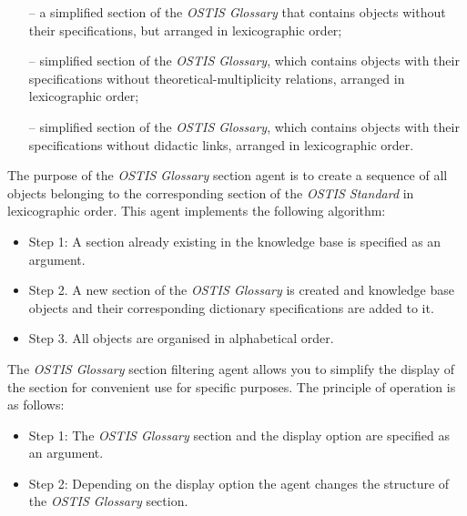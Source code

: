 \documentclass[10pt,a4paper]{article}
\begin{document}
\begin{multicols}{2}
\begin{itemize}

\item[--] a simplified section of the \textit{OSTIS Glossary} that contains objects without their specifications, but arranged in lexicographic order;
\item[--] simplified section of the \textit{OSTIS Glossary}, which contains objects with their specifications without theoretical-multiplicity relations, arranged in lexicographic order;
\item[--] simplified section of the \textit{OSTIS Glossary}, which contains objects with their specifications without didactic links, arranged in lexicographic order.
\end{itemize}

The purpose of the \textit{OSTIS Glossary} section agent is to create a sequence of all objects belonging to the corresponding section of the \textit{OSTIS Standard} in lexicographic order. This agent implements the following algorithm:
\begin{itemize}
\item Step 1: A section already existing in the knowledge base is specified as an argument.
\item Step 2. A new section of the \textit{OSTIS Glossary} is created and knowledge base objects and their corresponding dictionary specifications are added to it.
\item Step 3. All objects are organised in alphabetical order.
\end{itemize}

The \textit{OSTIS Glossary} section filtering agent allows you to simplify the display of the section for convenient use for specific purposes. The principle of operation is as follows:
\begin{itemize}
\item Step 1: The \textit{OSTIS Glossary} section and the display option are specified as an argument.
\item Step 2: Depending on the display option the agent changes the structure of the \textit{OSTIS Glossary} section.
\end{itemize}


\end{multicols}
\end{document}
